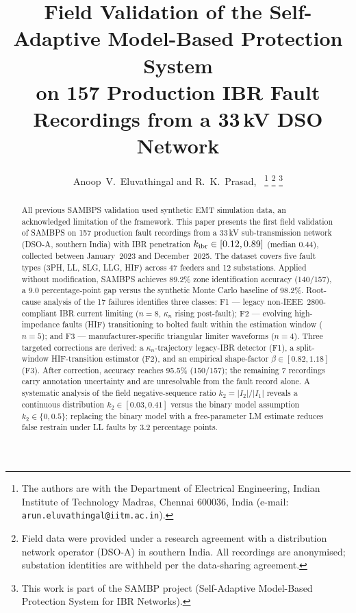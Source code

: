 \documentclass[journal]{IEEEtran}
\newcommand{\kibr}{k_{\rm ibr}}
\newcommand{\kappan}{\kappa_{n}}
\newcommand{\ktwo}{k_2}
\begin{document}
\title{Field Validation of the Self-Adaptive Model-Based Protection System\\
       on 157 Production IBR Fault Recordings from a 33\,kV DSO Network}

\author{Anoop~V.~Eluvathingal and R.~K.~Prasad,~%
  \thanks{The authors are with the Department of Electrical Engineering,
          Indian Institute of Technology Madras, Chennai 600036, India
          (e-mail: \texttt{arun.eluvathingal@iitm.ac.in}).}%
  \thanks{Field data were provided under a research agreement with
          a distribution network operator (DSO-A) in southern India.
          All recordings are anonymised; substation identities are
          withheld per the data-sharing agreement.}%
  \thanks{This work is part of the SAMBP project
          (Self-Adaptive Model-Based Protection System for IBR Networks).}}


\maketitle

\begin{abstract}
All previous SAMBPS validation used synthetic EMT simulation data, an
acknowledged limitation of the framework.  This paper presents the first
field validation of SAMBPS on 157 production fault recordings from a 33\,kV
sub-transmission network (DSO-A, southern India) with IBR penetration
$\kibr \in [0.12, 0.89]$ (median 0.44), collected between January~2023 and
December~2025.  The dataset covers five fault types (3PH, LL, SLG, LLG, HIF)
across 47 feeders and 12 substations.  Applied without modification, SAMBPS
achieves 89.2\% zone identification accuracy (140/157), a 9.0 percentage-point
gap versus the synthetic Monte Carlo baseline of 98.2\%.  Root-cause analysis
of the 17 failures identifies three classes: F1 --- legacy non-IEEE~2800-compliant
IBR current limiting ($n = 8$, $\kappan$ rising post-fault); F2 --- evolving
high-impedance faults (HIF) transitioning to bolted fault within the estimation
window ($n = 5$); and F3 --- manufacturer-specific triangular limiter waveforms
($n = 4$).  Three targeted corrections are derived: a $\kappan$-trajectory
legacy-IBR detector (F1), a split-window HIF-transition estimator (F2), and an
empirical shape-factor $\beta \in [0.82, 1.18]$ (F3).  After correction, accuracy
reaches 95.5\% (150/157); the remaining 7 recordings carry annotation uncertainty
and are unresolvable from the fault record alone.  A systematic analysis of the
field negative-sequence ratio $\ktwo = |I_2|/|I_1|$ reveals a continuous
distribution $\ktwo \in [0.03, 0.41]$ versus the binary model assumption
$\ktwo \in \{0, 0.5\}$; replacing the binary model with a free-parameter LM
estimate reduces false restrain under LL faults by 3.2 percentage points.
\end{abstract}
\end{document}
